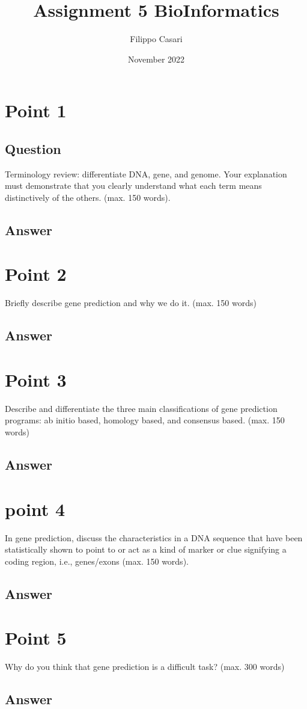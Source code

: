 \documentclass{article}
\title{Assignment 5 BioInformatics}
\author{Filippo Casari}
\date{November 2022}
\begin{document}
\maketitle

\section{Point 1}
\subsection*{Question}
Terminology review: differentiate DNA, gene, and genome. Your explanation
must demonstrate that you clearly understand what each term means distinctively
of the others. (max. 150 words).
\subsection*{Answer}

\section{Point 2}
Briefly describe gene prediction and why we do it. (max. 150 words)
\subsection*{Answer}
\section{Point 3}
Describe and differentiate the three main classifications of gene prediction
programs: ab initio based, homology based, and consensus based. (max. 150
words)
\subsection*{Answer}

\section{point 4}
In gene prediction, discuss the characteristics in a DNA sequence that have been
statistically shown to point to or act as a kind of marker or clue signifying a coding
region, i.e., genes/exons (max. 150 words).
\subsection*{Answer}

\section{Point 5}
Why do you think that gene prediction is a difficult task? (max. 300 words)
\subsection*{Answer}
\end{document}
